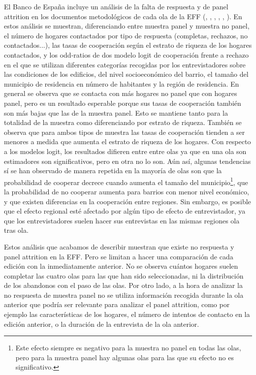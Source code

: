 El Banco de España incluye un análisis de la falta de respuesta y de panel attrition en los documentos metodológicos de cada ola de la EFF (\cite{effmethod2002}, \cite{effmethod2005}, \cite{effmethod2008}, \cite{effmethod2011}, \cite{effmethod2014}, \cite{effmethod2017}). En estos análisis se muestran, diferenciando entre muestra panel y muestra no panel, el número de hogares contactados por tipo de respuesta (completas, rechazos, no contactados...), las tasas de cooperación según el estrato de riqueza de los hogares contactados, y los odd-ratios de dos modelo logit de cooperación frente a rechazo en el que se utilizan diferentes categorías recogidas por los entrevistadores sobre las condiciones de los edificios, del nivel socioeconómico del barrio, el tamaño del municipio de residencia en número de habitantes y la región de residencia. En general se observa que se contacta con más hogares no panel que con hogares panel, pero es un resultado esperable porque sus tasas de cooperación también son más bajas que las de la muestra panel. Esto se mantiene tanto para la totalidad de la muestra como diferenciando por estrato de riqueza. También se observa que para ambos tipos de muestra las tasas de cooperación tienden a ser menores a medida que aumenta el estrato de riqueza de los hogares. Con respecto a los modelos logit, los resultados difieren entre entre olas ya que en una ola son estimadores son significativos, pero en otra no lo son. Aún así, algunas tendencias sí se han observado de manera repetida en la mayoría de olas son que la probabilidad de cooperar decrece cuando aumenta el tamaño del municipio\footnote{Este efecto siempre es negativo para la muestra no panel en todas las olas, pero para la muestra panel hay algunas olas para las que su efecto no es significativo.}, que la probabilidad de no cooperar aumenta para barrios con menor nivel económico, y que existen diferencias en la cooperación entre regiones. Sin embargo, es posible que el efecto regional esté afectado por algún tipo de efecto de entrevistador, ya que los entrevistadores suelen hacer sus entrevistas en las mismas regiones ola tras ola.

Estos análisis que acabamos de describir muestran que existe no respuesta y panel attrition en la EFF. Pero se limitan a hacer una comparación de cada edición con la inmediatamente anterior. No se observa cuántos hogares suelen completar las cuatro olas para las que han sido seleccionadas, ni la distribución de los abandonos con el paso de las olas. Por otro lado, a la hora de analizar la no respuesta de muestra panel no se utiliza información recogida durante la ola anterior que podría ser relevante para analizar el panel attrition, como por ejemplo las características de los hogares, el número de intentos de contacto en la edición anterior, o la duración de la entrevista de la ola anterior.


